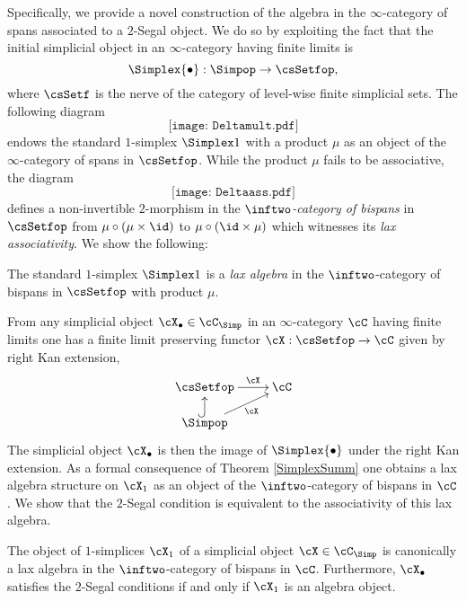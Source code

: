 \documentclass[a4paper]{article}
\numberwithin{equation}{section}
\begin{document}
  Specifically, we provide a novel construction of the algebra in the $\infty$-category of spans associated to a $2$-Segal object. We do so by exploiting the fact that the initial simplicial object in an $\infty$-category having finite limits is 
  \begin{equation*}
  \Simplex{\bullet}: \Simpop \to \csSetfop,
  \end{equation*}
where $\csSetf$ is the nerve of the category of level-wise finite simplicial sets. The following diagram
\begin{equation}
\label{DeltaProd}
 \texttt{[image: Deltamult.pdf]}
\end{equation}
endows the standard $1$-simplex $\Simplex 1$ with a product $\mu$ as an object of the $\infty$-category of spans in $\csSetfop$. While the product $\mu$ fails to be associative, the diagram
\begin{equation*}
 \texttt{[image: Deltaass.pdf]}
\end{equation*}
defines a non-invertible $2$-morphism in the {\em $\inftwo$-category of bispans} \cite{RuneSpans} in $\csSetfop$ from $\mu \circ (\mu\times\id)$ to $\mu \circ ( \id\times\mu)$ which witnesses its {\em lax associativity}. We show the following:

\begin{thmintro}
\label{SimplexSumm}
 The standard $1$-simplex $\Simplex 1$ is a {\em lax algebra} in the $\inftwo$-category of bispans in $\csSetfop$ with product $\mu$.
\end{thmintro}

From any simplicial object $\cX_\bullet\in \cC_\Simp$ in an $\infty$-category $\cC$ having finite limits one has a finite limit preserving functor $\cX:\csSetfop \to \cC$ given by right Kan extension,
\begin{equation*}
 \xymatrixrowsep{1.1pc} \xymatrix{ \csSetfop \ar[r]^-\cX & \cC \\
 \Simpop \ar@{^{(}->}[u] \ar[ru]_-\cX & }
\end{equation*}
The simplicial object $\cX_\bullet$ is then the image of $\Simplex{\bullet}$ under the right Kan extension. As a formal consequence of Theorem \ref{SimplexSumm} one obtains a lax algebra structure on $\cX_1$ as an object of the $\inftwo$-category of bispans in $\cC$. We show that the $2$-Segal condition is equivalent to the associativity of this lax algebra. 

\begin{thmintro}
 \label{MainSummAlg} 
 The object of $1$-simplices $\cX_1$ of a simplicial object $\cX \in \cC_\Simp$ is canonically a lax algebra in the $\inftwo$-category of bispans in $\cC$. Furthermore, $\cX_\bullet$ satisfies the $2$-Segal conditions if and only if $\cX_1$ is an algebra object.  
\end{thmintro}
\end{document}
